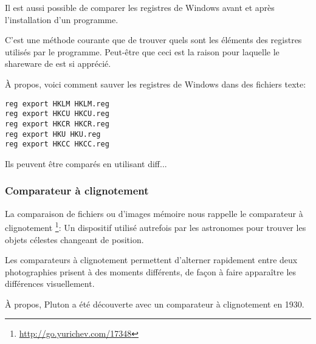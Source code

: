 Il est aussi possible de comparer les registres de Windows avant et après l'installation
d'un programme.

C'est une méthode courante  que de trouver quels sont les éléments des registres
utilisés par le programme. Peut-être que ceci est la raison pour laquelle le shareware
de  est si apprécié.

À propos, voici comment sauver les registres de Windows dans des fichiers texte:

\begin{lstlisting}
reg export HKLM HKLM.reg
reg export HKCU HKCU.reg
reg export HKCR HKCR.reg
reg export HKU HKU.reg
reg export HKCC HKCC.reg
\end{lstlisting}

Ils peuvent être comparés en utilisant diff...

\subsubsection{Comparateur à clignotement}

La comparaison de fichiers ou d'images mémoire nous rappelle le comparateur à clignotement
\footnote{\url{http://go.yurichev.com/17348}}:
Un dispositif utilisé autrefois par les astronomes pour trouver les objets célestes
changeant de position.

Les comparateurs à clignotement permettent d'alterner rapidement entre deux photographies
prisent à des moments différents, de façon à faire apparaître les différences visuellement.

À propos, Pluton a été découverte avec un comparateur à clignotement en 1930.
